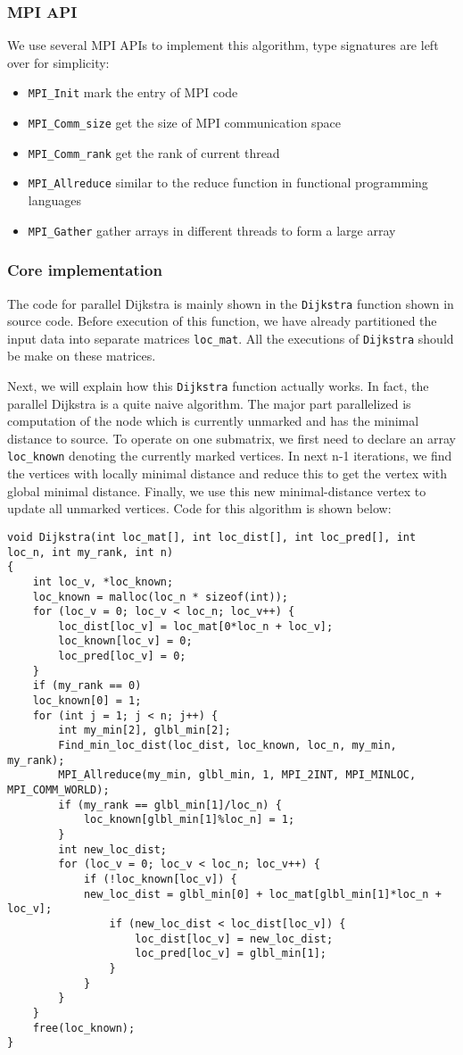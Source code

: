 \documentclass{article}
\begin{document}
\subsubsection{MPI API}
We use several MPI APIs to implement this algorithm, type signatures are left over for simplicity:
\begin{itemize}
	\item \verb|MPI_Init| mark the entry of MPI code
	\item \verb|MPI_Comm_size| get the size of MPI communication space
	\item \verb|MPI_Comm_rank| get the rank of current thread
	\item \verb|MPI_Allreduce| similar to the reduce function in functional programming languages
	\item \verb|MPI_Gather| gather arrays in different threads to form a large array
\end{itemize}
\subsubsection{Core implementation}
The code for parallel Dijkstra is mainly shown in the \verb|Dijkstra| function shown in source code. Before execution of this function, we have already partitioned the input data into separate matrices \verb|loc_mat|. All the executions of \verb|Dijkstra| should be make on these matrices.

Next, we will explain how this \verb|Dijkstra| function actually works. In fact, the parallel Dijkstra is a quite naive algorithm. The major part parallelized is computation of the node which is currently unmarked and has the minimal distance to source. To operate on one submatrix, we first need to declare an array \verb|loc_known| denoting the currently marked vertices. In next n-1 iterations, we find the vertices with locally minimal distance and reduce this to get the vertex with global minimal distance. Finally, we use this new minimal-distance vertex to update all unmarked vertices. Code for this algorithm is shown below:
\begin{lstlisting}
void Dijkstra(int loc_mat[], int loc_dist[], int loc_pred[], int loc_n, int my_rank, int n)
{
	int loc_v, *loc_known;
	loc_known = malloc(loc_n * sizeof(int));
	for (loc_v = 0; loc_v < loc_n; loc_v++) {
		loc_dist[loc_v] = loc_mat[0*loc_n + loc_v];
		loc_known[loc_v] = 0;
		loc_pred[loc_v] = 0;
	}
	if (my_rank == 0)
	loc_known[0] = 1;
	for (int j = 1; j < n; j++) {
		int my_min[2], glbl_min[2];
		Find_min_loc_dist(loc_dist, loc_known, loc_n, my_min, my_rank);
		MPI_Allreduce(my_min, glbl_min, 1, MPI_2INT, MPI_MINLOC, MPI_COMM_WORLD);
		if (my_rank == glbl_min[1]/loc_n) {
			loc_known[glbl_min[1]%loc_n] = 1;
		}
		int new_loc_dist;
		for (loc_v = 0; loc_v < loc_n; loc_v++) {
			if (!loc_known[loc_v]) {
			new_loc_dist = glbl_min[0] + loc_mat[glbl_min[1]*loc_n + loc_v];	
				if (new_loc_dist < loc_dist[loc_v]) {
					loc_dist[loc_v] = new_loc_dist;
					loc_pred[loc_v] = glbl_min[1];
				}
			}
		}
	}
	free(loc_known);
}
\end{lstlisting}
\end{document}
